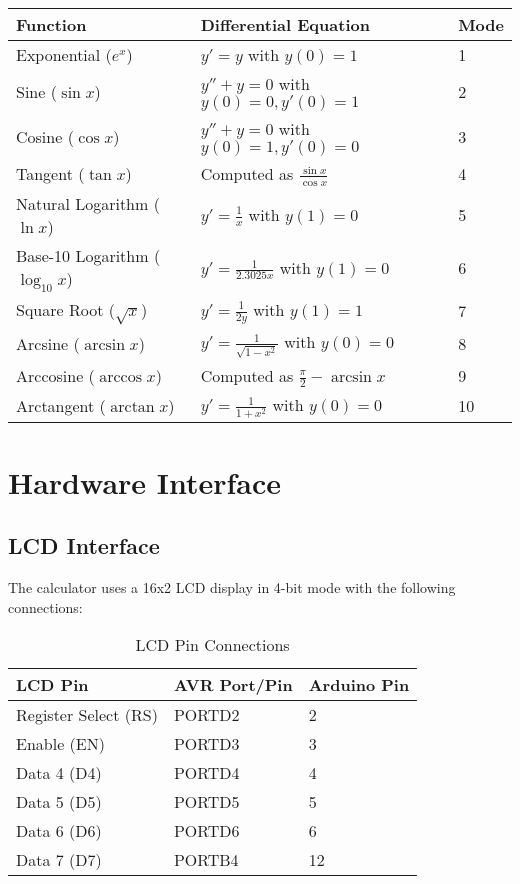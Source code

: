 \documentclass{article}
\begin{document}
\begin{tabularx}{\textwidth}{|l|X|l|}
\hline
\textbf{Function} & \textbf{Differential Equation} & \textbf{Mode} \\
\hline
Exponential ($e^x$) & $y' = y$ with $y(0) = 1$ & 1 \\
\hline
Sine ($\sin x$) & $y'' + y = 0$ with $y(0) = 0, y'(0) = 1$ & 2 \\
\hline
Cosine ($\cos x$) & $y'' + y = 0$ with $y(0) = 1, y'(0) = 0$ & 3 \\
\hline
Tangent ($\tan x$) & Computed as $\frac{\sin x}{\cos x}$ & 4 \\
\hline
Natural Logarithm ($\ln x$) & $y' = \frac{1}{x}$ with $y(1) = 0$ & 5 \\
\hline
Base-10 Logarithm ($\log_{10} x$) & $y' = \frac{1}{2.3025x}$ with $y(1) = 0$ & 6 \\
\hline
Square Root ($\sqrt{x}$) & $y' = \frac{1}{2y}$ with $y(1) = 1$ & 7 \\
\hline
Arcsine ($\arcsin x$) & $y' = \frac{1}{\sqrt{1-x^2}}$ with $y(0) = 0$ & 8 \\
\hline
Arccosine ($\arccos x$) & Computed as $\frac{\pi}{2} - \arcsin x$ & 9 \\
\hline
Arctangent ($\arctan x$) & $y' = \frac{1}{1+x^2}$ with $y(0) = 0$ & 10 \\
\hline
\end{tabularx}

\section{Hardware Interface}

\subsection{LCD Interface}
The calculator uses a 16x2 LCD display in 4-bit mode with the following connections:

\begin{table}[h]
\centering
\begin{tabular}{|l|l|l|}
\hline
\textbf{LCD Pin} & \textbf{AVR Port/Pin} & \textbf{Arduino Pin} \\
\hline
Register Select (RS) & PORTD2 & 2 \\
\hline
Enable (EN) & PORTD3 & 3 \\
\hline
Data 4 (D4) & PORTD4 & 4 \\
\hline
Data 5 (D5) & PORTD5 & 5 \\
\hline
Data 6 (D6) & PORTD6 & 6 \\
\hline
Data 7 (D7) & PORTB4 & 12 \\
\hline
\end{tabular}
\caption{LCD Pin Connections}
\end{table}
\end{document}
